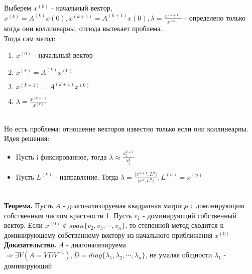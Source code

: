     Выберем \(x^{(0)}\) - начальный вектор,\( x^{(k)} = A^{(k)}x{(0)}, x^{(k + 1)} = A^{(k + 1)}x{(0)}, \lambda = \frac{x^{(k+1)}}{x^{(n)}}\) - определено только когда они коллинеарны, отсюда вытекает проблема. \\
    Тогда сам метод: 
    \begin{enumerate}
        \item $x^{(0)}$ - начальный вектор 
        \item $x^{(k)} = A^{(k)}x^{(0)}$
        \item $x^{(k+1)} = A^{(k+1)}x^{(0)}$
        \item $\lambda = \frac{x^{(k+1)}}{x^{(k)}}$
    \end{enumerate}
    \\  
    Но есть проблема: отношение векторов известно только если они коллинеарны.
    \\ Идея решения:
    \begin{itemize}
        \item Пусть i фиксированное, тогда \(\lambda \approx \frac{x_i^{k+1}}{x_i^{k}}\)
        \item Пусть \(L^{(k)}\) - направление. Тогда \(\lambda = \frac{\langle x^{k+1}, L^{n} \rangle}{\langle x^{k}, L^{n} \rangle}, L^{(n)} = x^{(n)}\)
    \end{itemize} \\

    \textbf{Теорема.} Пусть \(A\) - диагонализируемая квадратная матрица с доминирующим собственным числом крастности 1. Пусть \(v_1\) - доминирующий собственный вектор. Если \(x^{(0)} \notin span\{v_2,v_3,\cdots,v_n\}\), то степенной метод сходится к доминирующему собственному вектору из начального приближения \(x^{(0)}\) \\

    \textbf{Доказательство.} \(A\) - диагонализируема \(\Rightarrow \exists V(A = VDV^{-1}), D = diag \{\lambda_1, \lambda_2, \cdots, \lambda_n\}\), не умаляя общности \(\lambda_1\) - доминирующий \\

